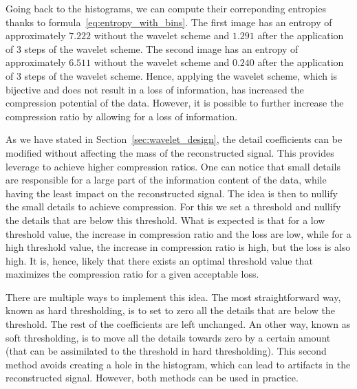 Going back to the histograms, we can compute their correponding entropies thanks to formula~\ref{eq:entropy_with_bins}.
The first image has an entropy of approximately $7.222$ without the wavelet scheme and $1.291$ after the application of 3 steps of the wavelet scheme.
The second image has an entropy of approximately $6.511$ without the wavelet scheme and $0.240$ after the application of 3 steps of the wavelet scheme.
Hence, applying the wavelet scheme, which is bijective and does not result in a loss of information, has increased the compression potential of the data.
However, it is possible to further increase the compression ratio by allowing for a loss of information.

As we have stated in Section~\ref{sec:wavelet_design}, the detail coefficients can be modified without affecting the mass of the reconstructed signal.
This provides leverage to achieve higher compression ratios.
One can notice that small details are responsible for a large part of the information content of the data, while having the least impact on the reconstructed signal.
The idea is then to nullify the small details to achieve compression.
For this we set a threshold and nullify the details that are below this threshold.
What is expected is that for a low threshold value, the increase in compression ratio and the loss are low, while for a high threshold value, the increase in compression ratio is high, but the loss is also high.
It is, hence, likely that there exists an optimal threshold value that maximizes the compression ratio for a given acceptable loss.

There are multiple ways to implement this idea.
The most straightforward way, known as hard thresholding, is to set to zero all the details that are below the threshold.
The rest of the coefficients are left unchanged.
An other way, known as soft thresholding, is to move all the details towards zero by a certain amount (that can be assimilated to the threshold in hard thresholding).
This second method avoids creating a hole in the histogram, which can lead to artifacts in the reconstructed signal.
However, both methods can be used in practice.

